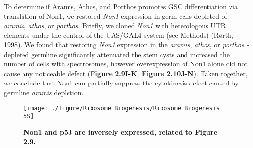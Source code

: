 \documentclass[12pt,oneside]{reedthesis}
\begin{document}

\textbf{\\
}

To determine if Aramis, Athos, and Porthos promotes GSC differentiation via translation of Non1, we restored \emph{Non1} expression in germ cells depleted of \emph{aramis}, \emph{athos}, or \emph{porthos}. Briefly, we cloned \emph{Non1} with heterologous UTR elements under the control of the UAS/GAL4 system (see Methods) (Rørth, 1998). We found that restoring \emph{Non1} expression in the \emph{aramis}, \emph{athos}, or \emph{porthos -}depleted germline significantly attenuated the stem cysts and increased the number of cells with spectrosomes, however overexpression of Non1 alone did not cause any noticeable defect (\textbf{Figure 2.9I-K, Figure 2.10J-N}). Taken together, we conclude that Non1 can partially suppress the cytokinesis defect caused by germline \emph{aramis} depletion.
\begin{figure}

{\centering \texttt{[image: ./figure/Ribosome Biogenesis/Ribosome Biogenesis 5S]} 

}

\caption[\textbf{Non1 and p53 are inversely expressed, related to Figure 2.9.}]{\textbf{Non1 and p53 are inversely expressed, related to Figure 2.9.}}\label{fig:unnamed-chunk-15}
\end{figure}
\end{document}
